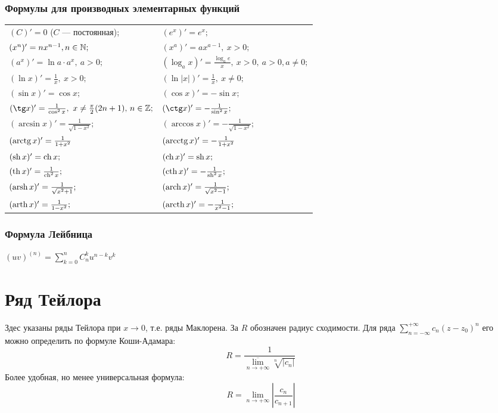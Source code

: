 \subsubsection{Формулы для производных элементарных функций}
\noindent\begin{longtable}[l]{ l l }
$(C)'=0$ ($C$ --- постоянная); 
&
$(e^x)'=e^x;$
\\
$(x^n)' = nx^{n-1}, n\in \mathbb{N};$
&
$(x^a)'=ax^{a-1},\ x>0;$
\\
$(a^x)'=\ln a\cdot a^x,\ a>0;$
&
$(\log_a x)'=\frac{\log_a e}{x},\ x>0,\ a>0, a\ne 0;$
\\
$(\ln x)' = \frac{1}{x},\ x>0;$
&
$(\ln |x|)' = \frac{1}{x},\ x\ne 0;$
\\
$(\sin x)'=\cos x;$
&
$(\cos x)'=-\sin x;$
\\
$(\tg x)'= \frac{1}{\cos^2 x},\ x \ne \frac{\pi}{2}(2n+1),\, n\in \bbZ;$
&
$(\ctg x)'= -\frac{1}{\sin^2 x};$ 
\\
$(\arcsin x)' = \frac{1}{\sqrt{1-x^2}};$
&
$(\arccos x)' = -\frac{1}{\sqrt{1-x^2}};$
\\
$(\mathop{\rm arctg}\nolimits x)' = \frac{1}{1+x^2}$
&
$(\mathop{\rm arcctg}\nolimits x)' = -\frac{1}{1+x^2}$
\\
$(\mathop{\rm sh}\nolimits x)'= \mathop{\rm ch}\nolimits x;$
&
$(\mathop{\rm ch}\nolimits x)'= \mathop{\rm sh}\nolimits x;$
\\
$(\mathop{\rm th}\nolimits x)'= \frac{1}{\mathop{\rm ch}\nolimits^2 x};$
&
$(\mathop{\rm cth}\nolimits x)'= -\frac{1}{\mathop{\rm sh}\nolimits^2 x};$
\\
$(\mathop{\rm arsh}\nolimits x)'=\frac{1}{\sqrt{x^2+1}};$
&
$(\mathop{\rm arch}\nolimits x)'=\frac{1}{\sqrt{x^2-1}};$
\\
$(\mathop{\rm arth}\nolimits x)'=\frac{1}{1-x^2};$
&
$(\mathop{\rm arcth}\nolimits x)'=-\frac{1}{x^2-1};$
\end{longtable}
\subsubsection{Формула Лейбница}
$(uv)^{(n)}=\sum\limits^n_{k=0} C^k_n u^{n-k} v^{k}$

\section[Ряд Тейлора]{Ряд Тейлора}

\begin{notion}
Здес указаны ряды Тейлора при $x \to 0$, т.е. ряды Маклорена. За $R$ обозначен радиус сходимости. Для ряда $\sum\limits_{n=-\infty}^{+\infty} c_n (z-z_0)^n $ его можно определить по формуле Коши-Адамара:
$$
R = \frac{1}{\overline{\lim\limits_{n \to + \infty}} \sqrt[n]{|c_n|}}
$$
Более удобная, но менее универсальная формула:$$
R = \lim\limits_{n \to + \infty} \left| \frac{c_n}{c_{n + 1}} \right|
$$
\end{notion}


